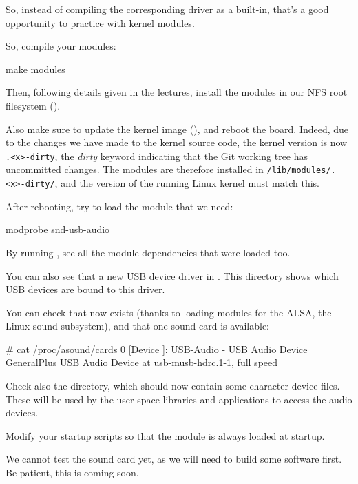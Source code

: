 {So, instead of compiling the corresponding driver as a built-in, that's
a good opportunity to practice with kernel modules.

So, compile your modules:
\begin{bashinput}
make modules
\end{bashinput}

Then, following details given in the lectures, install the modules in our NFS
root filesystem ().

Also make sure to update the kernel image (), and reboot the
board.  Indeed, due to the changes we have made to the kernel source code,
the kernel version is now {\tt \workingkernel.<x>-dirty}, the {\em dirty}
keyword indicating that the Git working tree has uncommitted changes.
The modules are therefore installed in {\tt /lib/modules/\workingkernel.<x>-dirty/},
and the version of the running Linux kernel must match this.

After rebooting, try to load the module that we need:

\begin{bashinput}
modprobe snd-usb-audio
\end{bashinput}

By running , see all the module dependencies that
were loaded too.

You can also see that a new USB device driver in
. This directory shows which
USB devices are bound to this driver.

You can check that  now exists (thanks to loading
modules for the ALSA, the Linux sound subsystem), and that one sound
card is available:

\begin{bashinput}
# cat /proc/asound/cards
 0 [Device         ]: USB-Audio - USB Audio Device
                      GeneralPlus USB Audio Device at usb-musb-hdrc.1-1, full speed
\end{bashinput}

Check also the  directory, which should now contain
some character device files. These will be used by the user-space
libraries and applications to access the audio devices.

Modify your startup scripts so that the  module
is always loaded at startup.

We cannot test the sound card yet, as we will need to build some
software first. Be patient, this is coming soon.

}
